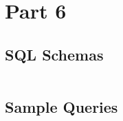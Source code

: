 \documentclass[american,extrafontsizes,12pt,portrait,letterpaper,oneside,onecolumn,final]{memoir}
\begin{document}
\chapter{Part 6}

\section{SQL Schemas}

\inputminted[linenos,breaklines,breakbytokenanywhere]{mysql}{../Part\ 6/mysql.sql}

\section{Sample Queries}
\begin{enumerate}[leftmargin=*,label={\strong{\uline{(\emph{\Alph*})}}}]


\end{enumerate}
\end{document}
